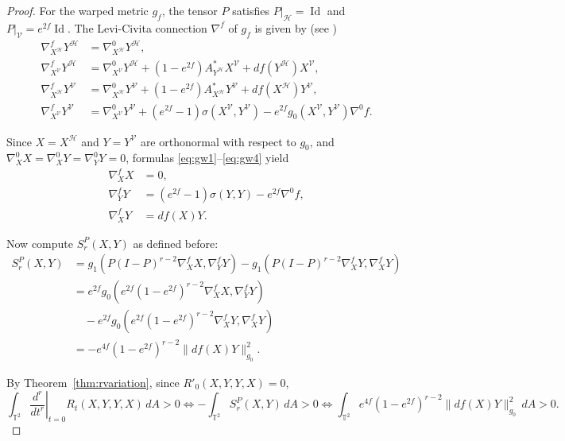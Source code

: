\documentclass[graybox]{svmult}
\begin{document}
\begin{proof}
For the warped metric $g_f$, the tensor $P$ satisfies $P|_{\mathcal{H}} = \operatorname{Id}$ and $P|_{\mathcal{V}} = e^{2f} \operatorname{Id}$. The Levi-Civita connection $\nabla^f$ of $g_f$ is given by (see \cite[Chapter 2]{gw})
\begin{align}
\nabla^f_{X^{\mathcal{H}}} Y^{\mathcal{H}} &= \nabla^0_{X^{\mathcal{H}}} Y^{\mathcal{H}}, \label{eq:gw1} \\
\nabla^f_{X^{\mathcal{V}}} Y^{\mathcal{H}} &= \nabla^0_{X^{\mathcal{V}}} Y^{\mathcal{H}} + (1 - e^{2f}) A^*_{Y^{\mathcal{H}}} X^{\mathcal{V}} + df(Y^{\mathcal{H}}) X^{\mathcal{V}}, \label{eq:gw2} \\
\nabla^f_{X^{\mathcal{H}}} Y^{\mathcal{V}} &= \nabla^0_{X^{\mathcal{H}}} Y^{\mathcal{V}} + (1 - e^{2f}) A^*_{X^{\mathcal{H}}} Y^{\mathcal{V}} + df(X^{\mathcal{H}}) Y^{\mathcal{V}}, \label{eq:gw3} \\
\nabla^f_{X^{\mathcal{V}}} Y^{\mathcal{V}} &= \nabla^0_{X^{\mathcal{V}}} Y^{\mathcal{V}} + (e^{2f} - 1) \sigma(X^{\mathcal{V}}, Y^{\mathcal{V}}) - e^{2f} g_0(X^{\mathcal{V}}, Y^{\mathcal{V}}) \nabla^0 f. \label{eq:gw4}
\end{align}

Since $X = X^{\mathcal{H}}$ and $Y = Y^{\mathcal{V}}$ are orthonormal with respect to $g_0$, and $\nabla^0_X X = \nabla^0_X Y = \nabla^0_Y Y = 0$, formulas \eqref{eq:gw1}--\eqref{eq:gw4} yield
\begin{align*}
\nabla^f_X X &= 0, \\
\nabla^f_Y Y &= (e^{2f} - 1) \sigma(Y,Y) - e^{2f} \nabla^0 f, \\
\nabla^f_X Y &= df(X) Y.
\end{align*}

Now compute $S_r^P(X,Y)$ as defined before:
\begin{align*}
S_r^P(X,Y) &= g_1\!\left(P(I-P)^{r-2} \nabla^f_X X, \nabla^f_Y Y\right) 
          - g_1\!\left(P(I-P)^{r-2} \nabla^f_X Y, \nabla^f_X Y\right) \\
&= e^{2f} g_0\!\left(e^{2f}(1 - e^{2f})^{r-2} \nabla^f_X X, \nabla^f_Y Y\right) \\
&\quad - e^{2f} g_0\!\left(e^{2f}(1 - e^{2f})^{r-2} \nabla^f_X Y, \nabla^f_X Y\right) \\
&= -e^{4f}(1 - e^{2f})^{r-2} \|df(X) Y\|_{g_0}^2.
\end{align*}

By Theorem~\ref{thm:rvariation}, since $R'_0(X,Y,Y,X) = 0$,
\[
\int_{\mathbb{T}^2} \left.\frac{d^r}{dt^r}\right|_{t=0} R_t(X,Y,Y,X) \, dA > 0
\Longleftrightarrow
-\int_{\mathbb{T}^2} S_r^P(X,Y) \, dA > 0
\Longleftrightarrow
\int_{\mathbb{T}^2} e^{4f}(1 - e^{2f})^{r-2} \|df(X) Y\|_{g_0}^2 \, dA > 0.
\]
\end{proof}
\end{document}
